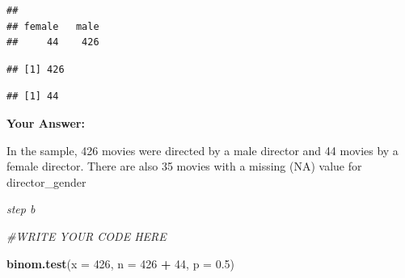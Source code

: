 \documentclass[
]{article}
\newenvironment{Shaded}{\begin{snugshade}}{\end{snugshade}}
\newcommand{\AttributeTok}[1]{\textcolor[rgb]{0.13,0.29,0.53}{#1}}
\newcommand{\CommentTok}[1]{\textcolor[rgb]{0.56,0.35,0.01}{\textit{#1}}}
\newcommand{\ConstantTok}[1]{\textcolor[rgb]{0.56,0.35,0.01}{#1}}
\newcommand{\DecValTok}[1]{\textcolor[rgb]{0.00,0.00,0.81}{#1}}
\newcommand{\FloatTok}[1]{\textcolor[rgb]{0.00,0.00,0.81}{#1}}
\newcommand{\FunctionTok}[1]{\textcolor[rgb]{0.13,0.29,0.53}{\textbf{#1}}}
\newcommand{\NormalTok}[1]{#1}
\newcommand{\SpecialCharTok}[1]{\textcolor[rgb]{0.81,0.36,0.00}{\textbf{#1}}}
\newcommand{\StringTok}[1]{\textcolor[rgb]{0.31,0.60,0.02}{#1}}
\begin{document}
\begin{Shaded}
\end{Shaded}

\begin{verbatim}
## 
## female   male 
##     44    426
\end{verbatim}

\begin{Shaded}
\end{Shaded}

\begin{verbatim}
## [1] 426
\end{verbatim}

\begin{Shaded}
\end{Shaded}

\begin{verbatim}
## [1] 44
\end{verbatim}

\textbf{Your Answer:}

In the sample, 426 movies were directed by a male director and 44 movies
by a female director. There are also 35 movies with a missing (NA) value
for director\_gender

\emph{step b}

\begin{Shaded}
\begin{Highlighting}[]
\CommentTok{\#WRITE YOUR CODE HERE}

\FunctionTok{binom.test}\NormalTok{(}\AttributeTok{x =} \DecValTok{426}\NormalTok{, }\AttributeTok{n =} \DecValTok{426} \SpecialCharTok{+} \DecValTok{44}\NormalTok{, }\AttributeTok{p =} \FloatTok{0.5}\NormalTok{)}
\end{Highlighting}
\end{Shaded}
\end{document}
